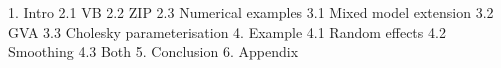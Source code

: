 
1. Intro
2.1 VB
2.2 ZIP
2.3 Numerical examples
3.1 Mixed model extension
3.2 GVA
3.3 Cholesky parameterisation
4. Example
4.1 Random effects
4.2 Smoothing
4.3 Both
5. Conclusion
6. Appendix

